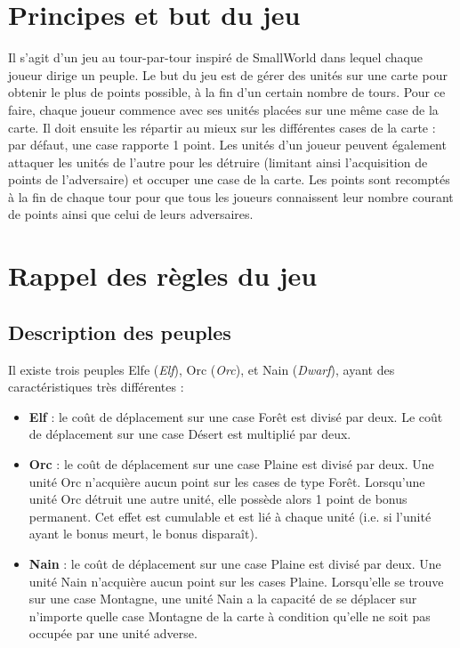 \section{Principes et but du jeu}

Il s’agit d’un jeu au tour-par-tour inspiré de \og SmallWorld \fg{} dans lequel chaque joueur dirige un peuple. Le but du jeu est de gérer des unités sur une carte pour obtenir le plus de points possible, à la fin d’un certain nombre de tours. Pour ce faire, chaque joueur commence avec ses unités placées sur une même case de la carte. Il doit ensuite les répartir au mieux sur les différentes cases de la carte : par défaut, une case rapporte 1 point. Les unités d’un joueur peuvent également attaquer les unités de l'autre pour les détruire (limitant ainsi l’acquisition de points de l’adversaire) et occuper une case de la carte. Les points sont recomptés à la fin de chaque tour pour que tous les joueurs connaissent leur nombre courant de points ainsi que celui de leurs adversaires.

\section{Rappel des règles du jeu}

\subsection{Description des peuples}

Il existe trois peuples Elfe (\textit{Elf}), Orc (\textit{Orc}), et Nain (\textit{Dwarf}), ayant des caractéristiques très différentes :

\begin{itemize}

\item \textbf{Elf} :  le coût de déplacement sur une case Forêt est divisé par deux. Le coût de déplacement sur une case Désert est multiplié par deux.
\item \textbf{Orc} : le coût de déplacement sur une case Plaine est divisé par deux. Une unité Orc n’acquière aucun point sur les cases de type Forêt. Lorsqu’une unité Orc détruit une autre unité, elle possède alors 1 point de bonus permanent. Cet effet est cumulable et est lié à chaque unité (i.e. si l’unité ayant le bonus meurt, le bonus disparaît).
\item \textbf{Nain} :  le coût de déplacement sur une case Plaine est divisé par deux. Une unité Nain n’acquière aucun point sur les cases Plaine. Lorsqu’elle se trouve sur une case Montagne, une unité Nain a la capacité de se déplacer sur n’importe quelle case Montagne de la carte à condition qu’elle ne soit pas occupée par une unité adverse.

\end{itemize}

